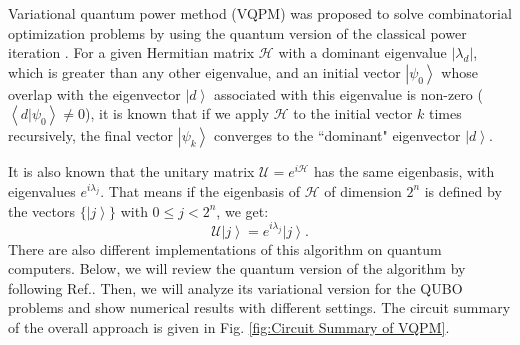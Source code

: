 \documentclass[onecolumn,10pt]{article}
\newcommand{\ket}[1]{\ensuremath{\left|#1\right\rangle}} %
\newcommand{\braket}[2]{\ensuremath{\left\langle#1|#2\right\rangle}}
\theoremstyle{remark}
\theoremstyle{plain}
\begin{document}
Variational quantum power method (VQPM) \cite{daskin2021combinatorial} was proposed to solve combinatorial optimization problems by using the quantum version \cite{daskin2018quantum} of the classical power iteration \cite{golub13}. 
For a given Hermitian matrix $\mathcal{H}$ with a dominant eigenvalue $|\lambda_{d}|$, which is greater than any other eigenvalue, and an initial vector $\ket{\psi_0}$ whose overlap with the eigenvector $\ket{d}$ associated with this eigenvalue is non-zero ($\braket{d}{\psi_0} \neq 0$), it is known that if we apply $\mathcal{H}$ to the initial vector $k$ times recursively, the final vector $\ket{\psi_k}$ converges to the ``dominant" eigenvector $\ket{d}$.

It is also known that the unitary matrix $\mathcal{U}=e^{i\mathcal{H}}$ has the same eigenbasis, with eigenvalues $e^{i\lambda_j}$.  
That means if the eigenbasis of $\mathcal{H}$ of dimension $2^n$ is defined by the vectors $\{\ket{j}\}$ with $0 \leq j < 2^n$, we get:
\begin{equation}
    \mathcal{U}\ket{j} = e^{i\lambda_j}\ket{j}.
\end{equation}
There are also different implementations of this algorithm on quantum computers.  
Below, we will review the quantum version of the algorithm by following Ref.\cite{daskin2018quantum}.  Then, we will analyze its variational version \cite{daskin2021combinatorial} for the QUBO problems and show numerical results with different settings. The circuit summary of the overall approach is given in Fig. \ref{fig:Circuit Summary of VQPM}. 
\end{document}
